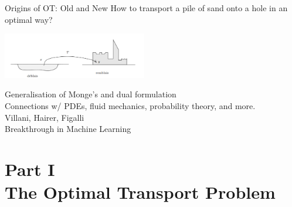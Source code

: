 \documentclass[pdf,aspectratio=169,10pt]{beamer}
\begin{document}
\begin{frame}{Origins of OT: Old and New }
 How to transport a pile of sand onto a hole in an optimal way?

  \begin{center}
  \includegraphics[height=2cm]{../img/deblais}\vspace{0.2cm}
  \end{center}

 Generalisation of Monge's and dual formulation\\


 Connections w/ PDEs, fluid mechanics,
probability theory, and more. \\

  Villani, Hairer, Figalli\\

 Breakthrough in Machine Learning

\end{frame}



\section{Part I\\ The Optimal Transport Problem}


\begin{frame}
    \Large {}
\end{frame}



{
\begin{frame}[plain]
\end{frame}
}
\end{document}
